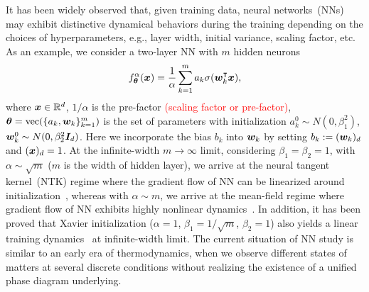 \documentclass{article}
\begin{document}
It has been widely observed that, given training data, neural networks~(NNs) may exhibit distinctive dynamical behaviors during the training depending on the choices of hyperparameters, e.g., layer width, initial variance, scaling factor, etc. As an example, we consider a two-layer NN with $m$ hidden neurons
\begin{equation}\label{eq: 2LNN}
    f^{\alpha}_{\bm{\theta}}(\bm{x}) = \frac{1}{\alpha}\sum_{k=1}^{m}a_k\sigma(\bm{w}_k^{\intercal}\bm{x}),
\end{equation}
where $\bm{x}\in\mathbb{R}^{d}$, $1/\alpha$ is the pre-factor \textcolor{red}{(scaling factor or pre-factor)}, $\bm{\theta}=\mathrm{vec}(\{a_k,\bm{w}_k\}_{k=1}^{m})$ is the set of parameters with initialization $a_k^0\sim N(0, \beta_1^2)$, $\bm{w}_k^0\sim N(0, \beta_2^2 \bm{I}_d)$. Here we incorporate the bias $b_k$ into $\bm{w}_k$ by setting $b_k:=(\bm{w}_k)_d$ and $(\bm{x})_d=1$. At the infinite-width $m\to\infty$ limit, considering $\beta_{1}=\beta_{2}=1$, with $\alpha\sim\sqrt{m}$ ($m$ is the width of hidden layer), we arrive at the neural tangent kernel~(NTK) regime where the gradient flow of NN can be linearized around initialization~\cite{jacot_neural_2018,arora2019exact,zhang_type_2019}, whereas with $\alpha\sim m$, we arrive at the mean-field regime where gradient flow of NN exhibits highly nonlinear dynamics~\cite{mei_mean_2018,rotskoff_parameters_2018,chizat_global_2018,sirignano_mean_2020}. In addition, it has been proved that Xavier initialization ($\alpha=1$, $\beta_{1}=1/\sqrt{m}$, $\beta_{2}=1$) also yields a linear training dynamics~\cite{ma2020quenching} at infinite-width limit. The current situation of NN study is similar to an early era of thermodynamics, when we observe different states of matters at several discrete conditions without realizing the existence of a unified phase diagram underlying.
\end{document}
